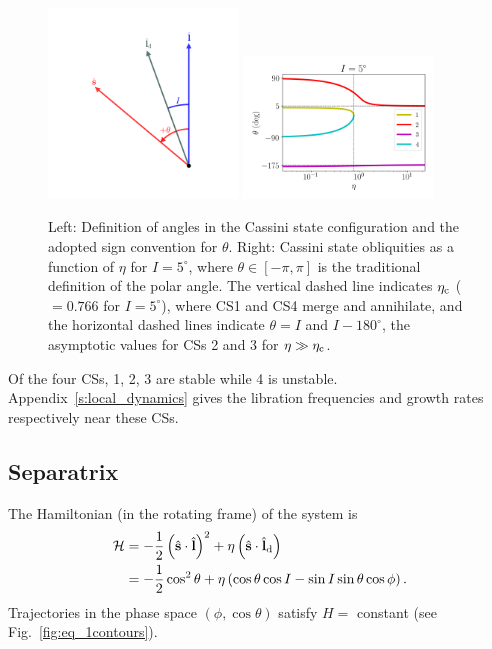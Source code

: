 \documentclass[
        fleqn,
        usenatbib,
    ]{mnras}
\newcommand*{\bm}[1]{\boldsymbol{\mathbf{#1}}}
\newcommand*{\uv}[1]{\hat{\bm{#1}}}
\newcommand*{\p}[1]{\left(#1\right)}
\begin{document}
\begin{figure}
    \includegraphics[width=0.45\textwidth]{plots_diskdisp/2_3vec.png}\hfil
    \includegraphics[width=0.45\textwidth]{plots_diskdisp/2_cs_locs.png}
    \caption{Left: Definition of angles in the Cassini state configuration and
    the adopted sign convention for $\theta$. Right: Cassini state obliquities
    as a function of $\eta$ for $I = 5^\circ$, where $\theta \in [-\pi, \pi]$
    is the traditional definition of the polar angle. The vertical dashed line
    indicates $\eta_{\rm c}$ ($= 0.766$ for $I = 5^\circ$), where CS1 and CS4
    merge and annihilate, and the horizontal dashed lines indicate $\theta = I$
    and $I - 180^\circ$, the asymptotic values for CSs 2 and 3 for $\eta \gg
    \eta_{\rm c}$.}\label{fig:cs_locs}
\end{figure}

Of the four CSs, 1, 2, 3 are stable while 4 is unstable.
Appendix~\ref{s:local_dynamics} gives the libration frequencies and growth rates
respectively near these CSs.

\subsection{Separatrix}

The Hamiltonian (in the rotating frame) of the system is
\begin{align}
    \mathcal{H} &= -\frac{1}{2}\p{\uv{s} \cdot \uv{l}}^2
            + \eta \p{\uv{s} \cdot \uv{l}_{\rm d}}\nonumber\\
        &= -\frac{1}{2}\cos^2\theta
            + \eta \p{\cos \theta \cos I - \sin I \sin \theta \cos \phi}
                \label{eq:H}.
\end{align}
Trajectories in the phase space $\p{\phi, \cos \theta}$ satisfy $H = $ constant
(see Fig.~\ref{fig:eq_1contours}).
\end{document}
